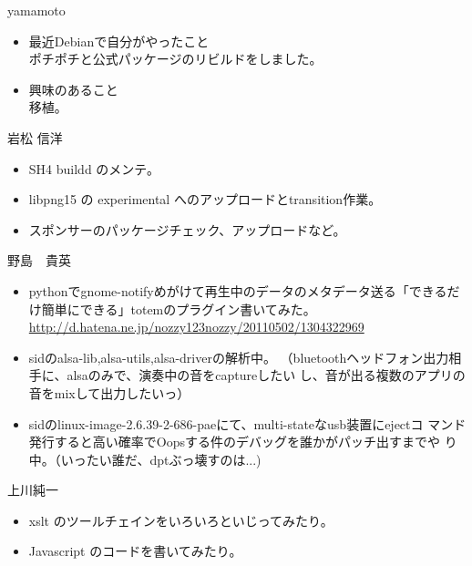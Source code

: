 \begin{prework}{ yamamoto }

\begin{itemize}
\item 最近Debianで自分がやったこと\\
ポチポチと公式パッケージのリビルドをしました。
\item 興味のあること\\
移植。
\end{itemize}

\end{prework}

\begin{prework}{ 岩松 信洋 }

\begin{itemize}
\item SH4 buildd のメンテ。
\item libpng15 の experimental へのアップロードとtransition作業。
\item スポンサーのパッケージチェック、アップロードなど。
\end{itemize}

\end{prework}

\begin{prework}{ 野島　貴英 }

\begin{itemize}

\item pythonでgnome-notifyめがけて再生中のデータのメタデータ送る「できるだ
 け簡単にできる」totemのプラグイン書いてみた。
 \url{http://d.hatena.ne.jp/nozzy123nozzy/20110502/1304322969}
\item sidのalsa-lib,alsa-utils,alsa-driverの解析中。
（bluetoothヘッドフォン出力相手に、alsaのみで、演奏中の音をcaptureしたい
 し、音が出る複数のアプリの音をmixして出力したいっ）
\item sidのlinux-image-2.6.39-2-686-paeにて、multi-stateなusb装置にejectコ
 マンド発行すると高い確率でOopsする件のデバッグを誰かがパッチ出すまでや
 り中。（いったい誰だ、dptぶっ壊すのは...)

\end{itemize}

\end{prework}

\begin{prework}{ 上川純一 }
\begin{itemize}
\item xslt のツールチェインをいろいろといじってみたり。
\item Javascript のコードを書いてみたり。
\end{itemize}
\end{prework}
